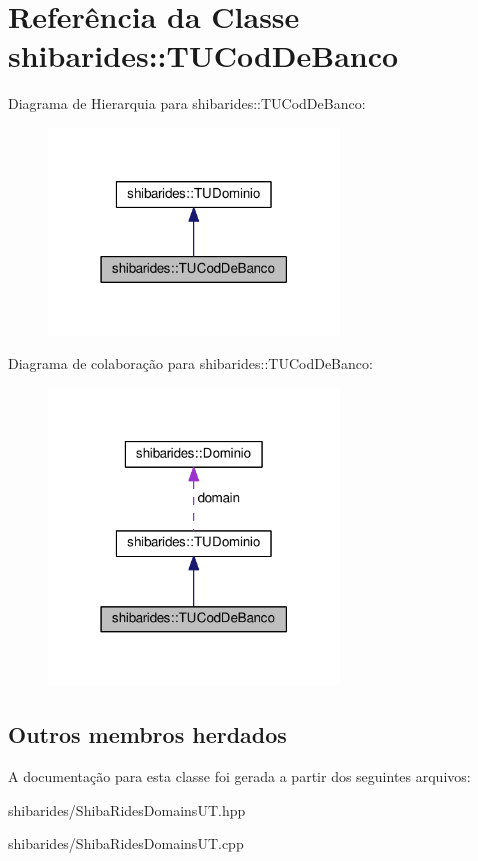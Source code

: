 \hypertarget{classshibarides_1_1TUCodDeBanco}{}\section{Referência da Classe shibarides\+:\+:T\+U\+Cod\+De\+Banco}
\label{classshibarides_1_1TUCodDeBanco}


Diagrama de Hierarquia para shibarides\+:\+:T\+U\+Cod\+De\+Banco\+:\nopagebreak
\begin{figure}[H]
\begin{center}
\leavevmode
\includegraphics[width=219pt]{classshibarides_1_1TUCodDeBanco__inherit__graph}
\end{center}
\end{figure}


Diagrama de colaboração para shibarides\+:\+:T\+U\+Cod\+De\+Banco\+:\nopagebreak
\begin{figure}[H]
\begin{center}
\leavevmode
\includegraphics[width=219pt]{classshibarides_1_1TUCodDeBanco__coll__graph}
\end{center}
\end{figure}
\subsection*{Outros membros herdados}


A documentação para esta classe foi gerada a partir dos seguintes arquivos\+:\begin{DoxyCompactItemize}
\item 
shibarides/Shiba\+Rides\+Domains\+U\+T.\+hpp\item 
shibarides/Shiba\+Rides\+Domains\+U\+T.\+cpp\end{DoxyCompactItemize}
